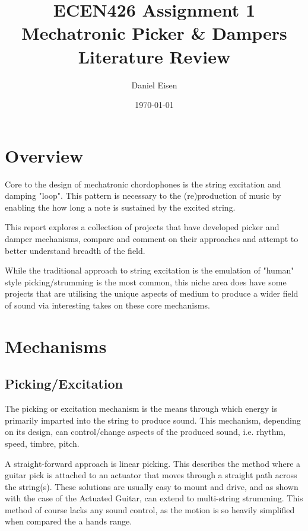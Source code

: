 \documentclass[11pt]{article}
\title{ECEN426 Assignment 1 \\ Mechatronic Picker \& Dampers Literature Review}
\author{Daniel Eisen}
\date{\today}
\begin{document}
\maketitle
\section{Overview}
Core to the design of mechatronic chordophones is the string excitation and damping "loop". This pattern is necessary to the (re)production of music by enabling the how long a note is sustained by the excited string.

This report explores a collection of projects that have developed picker and damper mechanisms, compare and comment on their approaches and attempt to better understand breadth of the field.

While the traditional approach to string excitation is the emulation of "human" style picking/strumming is the most common, this niche area does have some projects that are utilising the unique aspects of medium to produce a wider field of sound via interesting takes on these core mechanisms.


\section{Mechanisms}



\subsection{Picking/Excitation}
The picking or excitation mechanism is the means through which energy is primarily imparted into the string to produce sound. This mechanism, depending on its design, can control/change aspects of the produced sound, i.e. rhythm, speed, timbre, pitch.

A straight-forward approach is linear picking. This describes the method where a guitar pick is attached to an actuator that moves through a straight path across the string(s). These solutions are usually easy to mount and drive, and as shown with the case of the Actuated Guitar\cite{actuated}, can extend to multi-string strumming. This method of course lacks any sound control, as the motion is so heavily simplified when compared the a hands range.
\end{document}
